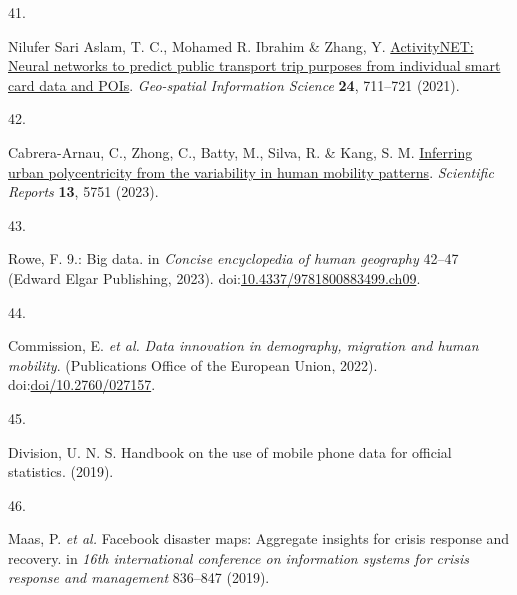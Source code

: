 \documentclass[
  11pt,
]{article}
\newlength{\cslhangindent}
\newlength{\csllabelwidth}
\newenvironment{CSLReferences}[2] %
 {\begin{list}{}{%
  \setlength{\itemindent}{0pt}
  \setlength{\leftmargin}{0pt}
  \setlength{\parsep}{0pt}
  \ifodd #1
   \setlength{\leftmargin}{\cslhangindent}
   \setlength{\itemindent}{-1\cslhangindent}
  \fi
  \setlength{\itemsep}{#2\baselineskip}}}
 {\end{list}}
\newcommand{\CSLLeftMargin}[1]{\parbox[t]{\csllabelwidth}{\strut#1\strut}}
\newcommand{\CSLRightInline}[1]{\parbox[t]{\linewidth - \csllabelwidth}{\strut#1\strut}}
\begin{document}
\begin{CSLReferences}{0}{0}
\CSLLeftMargin{41. }%
\CSLRightInline{Nilufer Sari Aslam, T. C., Mohamed R. Ibrahim \& Zhang,
Y. \href{https://doi.org/10.1080/10095020.2021.1985943}{ActivityNET:
Neural networks to predict public transport trip purposes from
individual smart card data and POIs}. \emph{Geo-spatial Information
Science} \textbf{24}, 711--721 (2021).}

\CSLLeftMargin{42. }%
\CSLRightInline{Cabrera-Arnau, C., Zhong, C., Batty, M., Silva, R. \&
Kang, S. M. \href{https://doi.org/10.1038/s41598-023-33003-7}{Inferring
urban polycentricity from the variability in human mobility patterns}.
\emph{Scientific Reports} \textbf{13}, 5751 (2023).}

\CSLLeftMargin{43. }%
\CSLRightInline{Rowe, F. 9.: Big data. in \emph{Concise encyclopedia of
human geography} 42--47 (Edward Elgar Publishing, 2023).
doi:\href{https://doi.org/10.4337/9781800883499.ch09}{10.4337/9781800883499.ch09}.}

\CSLLeftMargin{44. }%
\CSLRightInline{Commission, E. \emph{et al.} \emph{Data innovation in
demography, migration and human mobility}. (Publications Office of the
European Union, 2022).
doi:\href{https://doi.org/doi/10.2760/027157}{doi/10.2760/027157}.}

\CSLLeftMargin{45. }%
\CSLRightInline{Division, U. N. S. Handbook on the use of mobile phone
data for official statistics. (2019).}

\CSLLeftMargin{46. }%
\CSLRightInline{Maas, P. \emph{et al.} Facebook disaster maps: Aggregate
insights for crisis response and recovery. in \emph{16th international
conference on information systems for crisis response and management}
836--847 (2019).}

\end{CSLReferences}
\end{document}
